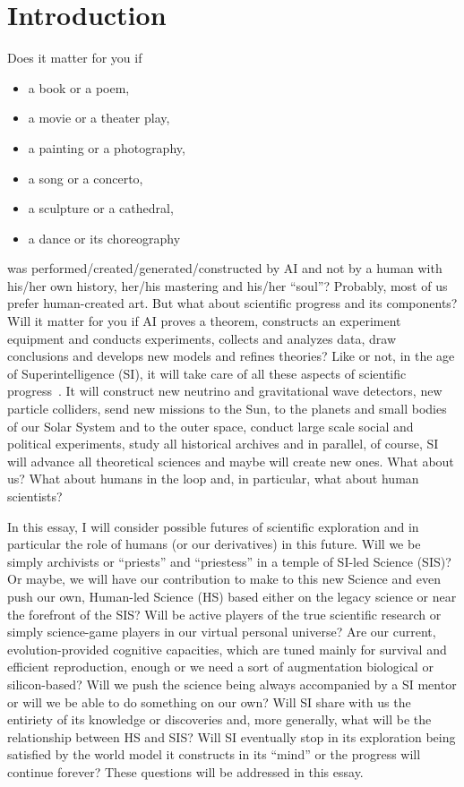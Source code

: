 \documentclass[a4paper,11pt]{article}
\begin{document}
\newpage

 	\tableofcontents




\newpage

    \section{Introduction}

    \noindent Does it matter for you if 
\begin{itemize}
    \item a book or a poem,
    \item a movie or a theater play,
    \item a painting or a photography,
    \item a song or a concerto,
    \item a sculpture or a cathedral,
    \item a dance or its choreography
\end{itemize}
was performed/created/generated/constructed by AI and not by a human with his/her own history, her/his mastering and his/her ``soul''? Probably, most of us prefer human-created art. But what about scientific progress and its components?
Will it matter for you if AI proves a theorem, constructs an experiment equipment and conducts experiments, collects and analyzes data, draw conclusions and develops new models and refines theories? Like or not, in the age of Superintelligence (SI), it will take care of all these aspects of scientific progress~\parencite{moravec1998will,moravec1999rise}. It will construct new neutrino and gravitational wave detectors, new particle colliders, send new missions to the Sun, to the planets and small bodies of our Solar System and to the outer space, conduct large scale social and political experiments, study all historical archives and in parallel, of course, SI will advance all theoretical sciences and maybe will create new ones. What about us? What about humans in the loop and, in particular, what about human scientists?

In this essay, I will consider possible futures of scientific exploration and in particular the role of humans (or our derivatives) in this future. Will we be simply archivists or ``priests'' and ``priestess'' in a temple of SI-led Science (SIS)? Or maybe, we will have our contribution to make to this new Science and even push our own, Human-led Science (HS) based either on the legacy science or near the forefront of the SIS? Will be active players of the true scientific research or simply science-game players in our virtual personal universe? Are our current, evolution-provided cognitive capacities, which are tuned mainly for survival and efficient reproduction, enough or we need a sort of augmentation biological or silicon-based? Will we push the science being always accompanied by a SI mentor or will we be able to do something on our own? Will SI share with us the entiriety of its knowledge or discoveries and, more generally, what will be the relationship between HS and SIS? Will SI eventually stop in its exploration being satisfied by the world model it constructs in its ``mind'' or the progress will continue forever? These questions will be addressed in this essay.
\end{document}
